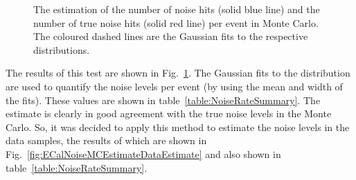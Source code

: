 \begin{figure}%
  \centering
  \caption{The estimation of the number of noise hits (solid blue line) and the number of true noise hits (solid red line) per event in Monte Carlo.  The coloured dashed lines are the Gaussian fits to the respective distributions.}
  \label{fig:ECalNoiseMCEstimateMCTrue}
\end{figure}
The results of this test are shown in Fig.~\ref{fig:ECalNoiseMCEstimateMCTrue}.  The Gaussian fits to the distribution are used to quantify the noise levels per event (by using the mean and width of the fits).  These values are shown in table~\ref{table:NoiseRateSummary}.  The estimate is clearly in good agreement with the true noise levels in the Monte Carlo.  So, it was decided to apply this method to estimate the noise levels in the data samples, the results of which are shown in Fig.~\ref{fig:ECalNoiseMCEstimateDataEstimate} and also shown in table~\ref{table:NoiseRateSummary}.
